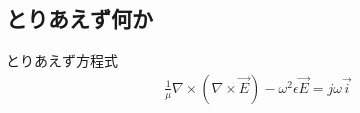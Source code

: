 \subsection{とりあえず何か}

とりあえず方程式
\begin{align}
\frac{1}{\mu}\nabla\times\left(\nabla\times\vec{E}\right)
-\omega^2\epsilon\vec{E}=j\omega\vec{i}
\end{align}
